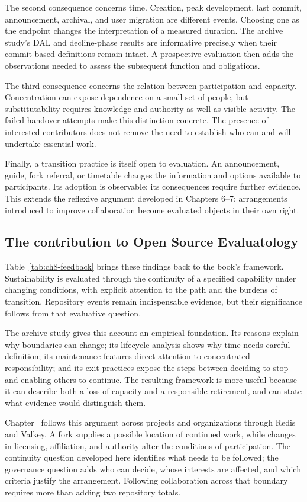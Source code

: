 The second consequence concerns time. Creation, peak development, last commit, announcement, archival, and user migration are different events. Choosing one as the endpoint changes the interpretation of a measured duration. The archive study's DAL and decline-phase results are informative precisely when their commit-based definitions remain intact. A prospective evaluation then adds the observations needed to assess the subsequent function and obligations.

The third consequence concerns the relation between participation and capacity. Concentration can expose dependence on a small set of people, but substitutability requires knowledge and authority as well as visible activity. The failed handover attempts make this distinction concrete. The presence of interested contributors does not remove the need to establish who can and will undertake essential work.

Finally, a transition practice is itself open to evaluation. An announcement, guide, fork referral, or timetable changes the information and options available to participants. Its adoption is observable; its consequences require further evidence. This extends the reflexive argument developed in Chapters 6--7: arrangements introduced to improve collaboration become evaluated objects in their own right.



\subsection{The contribution to Open Source Evaluatology}
Table~\ref{tab:ch8-feedback} brings these findings back to the book's framework. Sustainability is evaluated through the continuity of a specified capability under changing conditions, with explicit attention to the path and the burdens of transition. Repository events remain indispensable evidence, but their significance follows from that evaluative question.

The archive study gives this account an empirical foundation. Its reasons explain why boundaries can change; its lifecycle analysis shows why time needs careful definition; its maintenance features direct attention to concentrated responsibility; and its exit practices expose the steps between deciding to stop and enabling others to continue. The resulting framework is more useful because it can describe both a loss of capacity and a responsible retirement, and can state what evidence would distinguish them.

Chapter~ follows this argument across projects and organizations through Redis and Valkey. A fork supplies a possible location of continued work, while changes in licensing, affiliation, and authority alter the conditions of participation. The continuity question developed here identifies what needs to be followed; the governance question adds who can decide, whose interests are affected, and which criteria justify the arrangement. Following collaboration across that boundary requires more than adding two repository totals.
